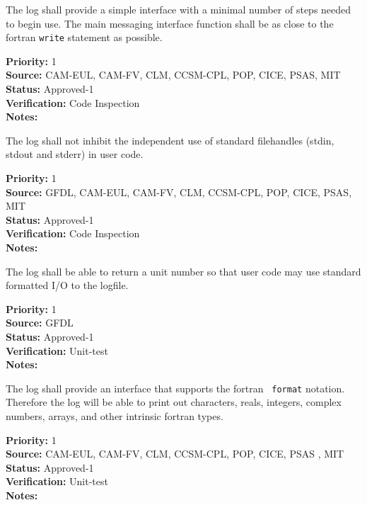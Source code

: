 
The log shall provide a simple interface with a minimal number of
steps needed to begin use.  The main messaging interface function shall be as
close to the fortran {\tt write} statement as possible.

\begin{reqlist}
{\bf Priority:} 1 \\
{\bf Source:} CAM-EUL, CAM-FV, CLM, CCSM-CPL, POP, CICE, PSAS, MIT  \\
{\bf Status:} Approved-1 \\
{\bf Verification:} Code Inspection \\
{\bf Notes:} 
\end{reqlist}


The log shall not inhibit the independent use of standard filehandles
(stdin, stdout and stderr) in user code.

\begin{reqlist}
{\bf Priority:} 1 \\
{\bf Source:} GFDL, CAM-EUL, CAM-FV, CLM, CCSM-CPL, POP, CICE, PSAS, MIT  \\
{\bf Status:} Approved-1 \\
{\bf Verification:} Code Inspection \\
{\bf Notes:} 
\end{reqlist}


The log shall be able to return a unit number so that user code may
use standard formatted I/O to the logfile.

\begin{reqlist}
{\bf Priority:} 1 \\
{\bf Source:} GFDL \\
{\bf Status:} Approved-1 \\
{\bf Verification:} Unit-test \\
{\bf Notes:} 
\end{reqlist}


The log shall provide an interface that supports the fortran {\tt
  format} notation.  Therefore the log will be able to print out
characters, reals, integers, complex numbers, arrays, and other
intrinsic fortran types.

\begin{reqlist}
{\bf Priority:} 1 \\
{\bf Source:} CAM-EUL, CAM-FV, CLM, CCSM-CPL, POP, CICE, PSAS , MIT \\
{\bf Status:} Approved-1 \\
{\bf Verification:} Unit-test \\
{\bf Notes:} 
\end{reqlist}

